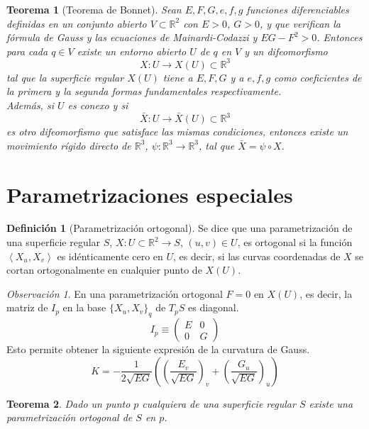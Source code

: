 \documentclass{report}
\newtheorem{theorem}{Teorema}[chapter]
\theoremstyle{remark}
\newtheorem*{remark}{Observación}
\theoremstyle{remark}
\theoremstyle{definition}
\newtheorem{definition}{Definición}[chapter]
\theoremstyle{definition}
\theoremstyle{definition}
\begin{document}
\begin{theorem}[Teorema de Bonnet]
    Sean $E, F, G, e, f, g$ funciones diferenciables definidas en un conjunto abierto $V \subset \mathbb{R}^2$ con $E > 0$, $G > 0$, y que verifican la fórmula de Gauss y las ecuaciones de Mainardi-Codazzi y $EG-F^2 > 0$.
    Entonces para cada $q \in V$ existe un entorno abierto $U$ de $q$ en $V$ y un difeomorfismo
    $$X: U \to X(U) \subset \mathbb{R}^3$$
    tal que la superficie regular $X(U)$ tiene a $E, F, G$ y a $e, f, g$ como coeficientes de la primera y la segunda formas fundamentales respectivamente.\\
    Además, si $U$ es conexo y si
    $$\bar{X}: U \to \bar{X}(U) \subset \mathbb{R}^3$$
    es otro difeomorfismo que satisface las mismas condiciones, entonces existe un movimiento rígido directo de $\mathbb{R}^3$, $\psi: \mathbb{R}^3 \to \mathbb{R}^3$, tal que $\bar{X} = \psi \circ X$.
\end{theorem}

\section{Parametrizaciones especiales}

\begin{definition}[Parametrización ortogonal]
    Se dice que una parametrización de una superficie regular $S$, $X: U \subset \mathbb{R}^2 \to S$, $(u, v) \in U$, es ortogonal si la función $\left\langle X_u, X_v \right\rangle$ es idénticamente cero en $U$, es decir, si las curvas coordenadas de $X$ se cortan ortogonalmente en cualquier punto de $X(U)$.
\end{definition}

\begin{remark}
    En una parametrización ortogonal $F = 0$ en $X(U)$, es decir, la matriz de $I_p$ en la base $\{X_u, X_v\}_q$ de $T_pS$ es diagonal.
    $$I_p \equiv
        \begin{pmatrix}
            E & 0 \\
            0 & G
        \end{pmatrix}$$
    Esto permite obtener la siguiente expresión de la curvatura de Gauss.
    $$K = -\frac{1}{2\sqrt{EG}} \left( \left( \frac{E_v}{\sqrt{EG}}\right)_v + \left( \frac{G_u}{\sqrt{EG}}\right)_u \right) $$
\end{remark}

\begin{theorem}
    Dado un punto $p$ cualquiera de una superficie regular $S$ existe una parametrización ortogonal de $S$ en $p$.
\end{theorem}
\end{document}
